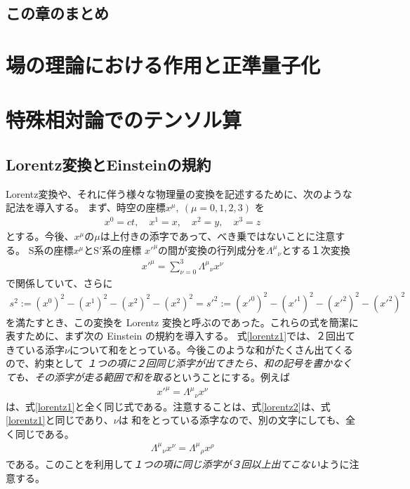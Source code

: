 \documentclass[report,paper=a4, fontsize=12pt, line_length=16cm, number_of_lines=33,dvipdfmx]{jlreq}
\numberwithin{equation}{chapter}
\newcommand{\Sp}{S$'$}
\begin{document}
\section{この章のまとめ}



\chapter{場の理論における作用と正準量子化}


\appendix
\chapter{特殊相対論でのテンソル算}
\label{app:tensor}
\section{Lorentz変換とEinsteinの規約}
Lorentz変換や、それに伴う様々な物理量の変換を記述するために、次のような記法を導入する。
まず、時空の座標$x^{\mu},\ (\mu=0,1,2,3)$ を
\begin{align}
x^{0}=ct,\quad x^{1}=x,\quad x^{2}=y,\quad x^{3}=z
\end{align}
とする。今後、$x^{\mu}$の$\mu$は上付きの添字であって、べき乗ではないことに注意する。
S系の座標$x^{\mu}$と\Sp 系の座標 $x'^{\mu}$の間が変換の行列成分を$\Lambda^{\mu}{}_{\nu}$とする１次変換
\begin{align}
 x'^{\mu}=\sum_{\nu=0}^{3}\Lambda^{\mu}{}_{\nu}x^{\nu}
\label{lorentz1}
\end{align}
で関係していて、さらに
\begin{align}
s^{2}
:=(x^{0})^{2}-(x^{1})^{2}-(x^{2})^{2}-(x^{2})^{2}
=s'^{2}
:=(x'^{0})^{2}-(x'^{1})^{2}-(x'^{2})^{2}-(x'^{2})^{2}
\end{align}
を満たすとき、この変換を Lorentz 変換と呼ぶのであった。これらの式を簡潔に表すために、まず次の Einstein の規約を導入する。
式\eqref{lorentz1}では、２回出てきている添字$\nu$について和をとっている。今後このような和がたくさん出てくるので、約束として
\emph{１つの項に２回同じ添字が出てきたら、和の記号を書かなくても、その添字が走る範囲で和を取る}ということにする。例えば
\begin{align}
 x'^{\mu}=\Lambda^{\mu}{}_{\nu}x^{\nu}
\label{lorentz2}
\end{align}
は、式\eqref{lorentz1}と全く同じ式である。注意することは、式\eqref{lorentz2}は、式\eqref{lorentz1}と同じであり、$\nu$は
和をとっている添字なので、別の文字にしても、全く同じである。
\begin{align}
\Lambda^{\mu}{}_{\nu}x^{\nu}
=\Lambda^{\mu}{}_{\rho}x^{\rho}
\end{align}
である。このことを利用して\emph{１つの項に同じ添字が３回以上出てこない}ように注意する。
\end{document}
